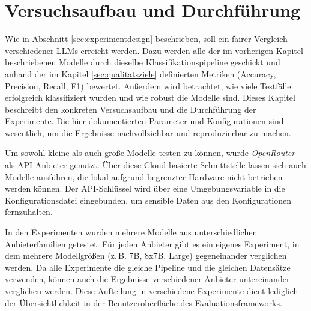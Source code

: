 \chapter{Versuchsaufbau und Durchführung}\label{ch:versuchsaufbau-und-durchfuhrung}

Wie in Abschnitt \ref{sec:experimentdesign} beschrieben, soll ein fairer Vergleich verschiedener \acp{LLM} erreicht werden. Dazu werden alle der im vorherigen Kapitel beschriebenen Modelle durch dieselbe Klassifikationspipeline geschickt und anhand der im Kapitel \ref{sec:qualitatsziele} definierten Metriken (Accuracy, Precision, Recall, F1) bewertet. Außerdem wird betrachtet, wie viele Testfälle erfolgreich klassifiziert wurden und wie robust die Modelle sind. Dieses Kapitel beschreibt den konkreten Versuchsaufbau und die Durchführung der Experimente. Die hier dokumentierten Parameter und Konfigurationen sind wesentlich, um die Ergebnisse nachvollziehbar und reproduzierbar zu machen.

Um sowohl kleine als auch große Modelle testen zu können, wurde \emph{OpenRouter} \cite{openrouter} als API-Anbieter genutzt. Über diese Cloud-basierte Schnittstelle lassen sich auch Modelle ausführen, die lokal aufgrund begrenzter Hardware nicht betrieben werden können. Der API-Schlüssel wird über eine Umgebungsvariable in die Konfigurationsdatei eingebunden, um sensible Daten aus den Konfigurationen fernzuhalten.

In den Experimenten wurden mehrere Modelle aus unterschiedlichen Anbieterfamilien getestet. Für jeden Anbieter gibt es ein eigenes Experiment, in dem mehrere Modellgrößen (z.\,B. 7B, 8x7B, Large) gegeneinander verglichen werden. Da alle Experimente die gleiche Pipeline und die gleichen Datensätze verwenden, können auch die Ergebnisse verschiedener Anbieter untereinander verglichen werden. Diese Aufteilung in verschiedene Experimente dient lediglich der Übersichtlichkeit in der Benutzeroberfläche des Evaluationsframeworks.




